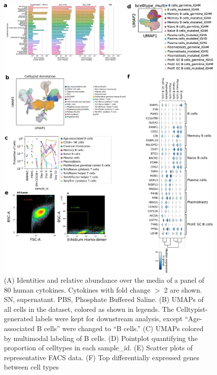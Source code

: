 \begin{figure}[hbt!]
\centering
\includegraphics[width=14cm, keepaspectratio]{figs/paper2/figs1_bcd.jpg}
\caption[Analysis of stimulation cocktail and presentation of pre-processing steps.]{(A) Identities and relative abundance over the media of a panel of 80 human cytokines. Cytokines with fold change $>$ 2 are shown. SN, supernatant. PBS, Phosphate Buffered Saline. (B) UMAPs of all cells in the dataset, colored as shown in legends. The Celltypist-generated labels were kept for downstream analysis, except “Age-associated B cells” were changed to “B cells.” (C) UMAPs colored by multimodal labeling of B cells. (D) Pointplot quantifying the proportion of celltypes in each sample\_id. (E) Scatter plots of representative FACS data. (F) Top differentially expressed genes between cell types}
\label{fig:paper2_fig_s1}
\end{figure}

